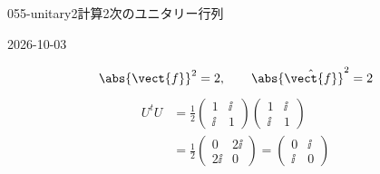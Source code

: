 \documentclass[uplatex,dvipdfmx,a4paper,11pt]{jsarticle}
\begin{document}
\begin{mondai}{055-unitary2}{計算}{2次のユニタリー行列}
\begin{kotaeutsushi}{2026-10-03}
\begin{align*}
\end{align*}
\[
  \abs{\vect{f}}^{2}=2,\qquad \abs{\hat{\vect{f}}}^{2}=2
\]
\begin{align*}
  U^{t}U&=\frac{1}{2}\begin{pmatrix}1&\ii\\\ii&1\end{pmatrix}\begin{pmatrix}1&\ii\\\ii&1\end{pmatrix}\\
  &=\frac{1}{2}\begin{pmatrix}0&2\ii\\2\ii&0\end{pmatrix}=\begin{pmatrix}0&\ii\\\ii&0\end{pmatrix}
\end{align*}
\end{kotaeutsushi}
\end{mondai}
\end{document}
